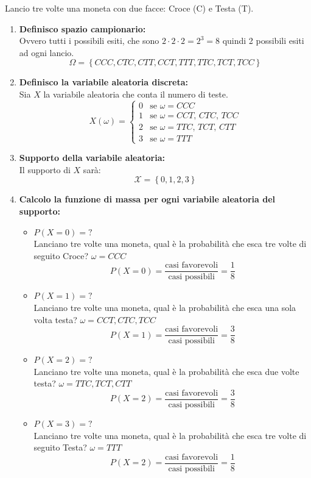 \documentclass{article}  %
\theoremstyle{definition}
\begin{document}
\begin{esercizio}[Esercizio]
	Lancio tre volte una moneta con due facce: Croce (C) e Testa (T).
	\begin{enumerate}
		\item \textbf{Definisco spazio campionario:} \\
		      Ovvero tutti i possibili esiti, che sono $2 \cdot 2 \cdot 2 = 2^3=8$ quindi 2 possibili esiti ad ogni lancio.
		      \[
			      \Omega= \left\{CCC, CTC, CTT, CCT, TTT, TTC, TCT, TCC \right\}
		      \]
		\item \textbf{Definisco la variabile aleatoria discreta:} \\
		      Sia $X$ la variabile aleatoria che conta il numero di teste.
		      \[
			      X(\omega)=
			      \begin{cases}
				      0 & \text{se } \omega = CCC               \\
				      1 & \text{se } \omega = CCT,\, CTC,\, TCC \\
				      2 & \text{se } \omega = TTC,\, TCT,\, CTT \\
				      3 & \text{se } \omega = TTT
			      \end{cases}
		      \]

		\item \textbf{Supporto della variabile aleatoria:} \\
		      Il supporto di $X$ sarà:
		      \[
			      \mathscr{X}= \left\{0,1,2,3 \right\}
		      \]
		\item \textbf{Calcolo la funzione di massa per ogni variabile aleatoria del supporto:}
		      \begin{itemize}
			      \item $P(X=0)=?$ \\
			            Lanciano tre volte una moneta, qual è la probabilità che esca tre volte di seguito Croce? $\omega=CCC$
			            \[
				            P(X=0)=\frac{\text{casi favorevoli}}{\text{casi possibili}}=\frac{1}{8}
			            \]
			      \item $P(X=1)=?$ \\
			            Lanciano tre volte una moneta, qual è la probabilità che esca una sola volta testa? $\omega=CCT,CTC,TCC$
			            \[
				            P(X=1)=\frac{\text{casi favorevoli}}{\text{casi possibili}}=\frac{3}{8}
			            \]
			      \item $P(X=2)=?$ \\
			            Lanciano tre volte una moneta, qual è la probabilità che esca due volte testa? $\omega=TTC,TCT,CTT$
			            \[
				            P(X=2)=\frac{\text{casi favorevoli}}{\text{casi possibili}}=\frac{3}{8}
			            \]
			      \item $P(X=3)=?$ \\
			            Lanciano tre volte una moneta, qual è la probabilità che esca tre volte di seguito Testa? $\omega=TTT$
			            \[
				            P(X=2)=\frac{\text{casi favorevoli}}{\text{casi possibili}}=\frac{1}{8}
			            \]
		      \end{itemize}


\end{enumerate}
\end{esercizio}
\end{document}
